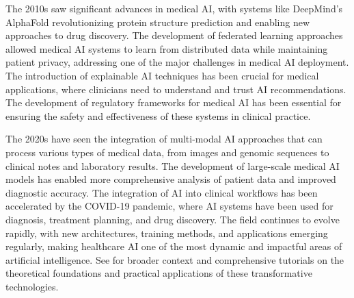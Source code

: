 The 2010s saw significant advances in medical AI, with systems like DeepMind's AlphaFold revolutionizing protein structure prediction and enabling new approaches to drug discovery. The development of federated learning approaches allowed medical AI systems to learn from distributed data while maintaining patient privacy, addressing one of the major challenges in medical AI deployment. The introduction of explainable AI techniques has been crucial for medical applications, where clinicians need to understand and trust AI recommendations. The development of regulatory frameworks for medical AI has been essential for ensuring the safety and effectiveness of these systems in clinical practice.

The 2020s have seen the integration of multi-modal AI approaches that can process various types of medical data, from images and genomic sequences to clinical notes and laboratory results. The development of large-scale medical AI models has enabled more comprehensive analysis of patient data and improved diagnostic accuracy. The integration of AI into clinical workflows has been accelerated by the COVID-19 pandemic, where AI systems have been used for diagnosis, treatment planning, and drug discovery. The field continues to evolve rapidly, with new architectures, training methods, and applications emerging regularly, making healthcare AI one of the most dynamic and impactful areas of artificial intelligence. See \textcite{Ronneberger2015,Prince2023} for broader context and comprehensive tutorials on the theoretical foundations and practical applications of these transformative technologies.

